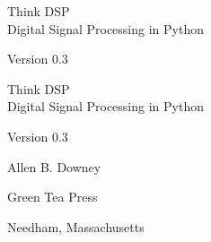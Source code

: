 \documentclass[12pt]{book}
\newcommand{\theversion}{0.3}
\begin{document}
\begin{latexonly}

\renewcommand{\blankpage}{\thispagestyle{empty} \quad \newpage}


\thispagestyle{empty}

\begin{flushright}
\vspace*{2.0in}

\begin{spacing}{3}
{\huge Think DSP}\\
{\Large Digital Signal Processing in Python}
\end{spacing}

\vspace{0.25in}

Version \theversion

\vfill

\end{flushright}


\blankpage
\blankpage

\pagebreak
\thispagestyle{empty}

\begin{flushright}
\vspace*{2.0in}

\begin{spacing}{3}
{\huge Think DSP}\\
{\Large Digital Signal Processing in Python}
\end{spacing}

\vspace{0.25in}

Version \theversion

\vspace{1in}


{\Large
Allen B. Downey\\
}


\vspace{0.5in}

{\Large Green Tea Press}

{\small Needham, Massachusetts}

\vfill

\end{flushright}


\pagebreak
\thispagestyle{empty}


\end{latexonly}
\end{document}
